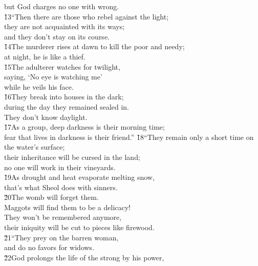 \begin{poetry}
\poemlll       but God charges no one with wrong. \\
\poeml \v{13}``Then there are those who rebel against the light; \\
\poemll    they are not acquainted with its ways; \\
\poemlll       and they don't stay on its course. \\
\poeml \v{14}The murderer rises at dawn to kill the poor and needy; \\
\poemll    at night, he is like a thief. \\
\poeml \v{15}The adulterer watches for twilight, \\
\poemll    saying, `No eye is watching me' \\
\poemlll       while he veils his face. \\
\poeml \v{16}They break into houses in the dark; \\
\poemll    during the day they remained sealed in. \\
\poemlll       They don't know daylight. \\
\poeml \v{17}As a group, deep darkness is their morning time; \\
\poemll    fear that lives in darkness is their friend.''
\poeml \v{18}``They remain only a short time on the water's surface; \\
\poemll    their inheritance will be cursed in the land; \\
\poemlll       no one will work in their vineyards. \\
\poeml \v{19}As drought and heat evaporate melting snow, \\
\poemll    that's what Sheol does with sinners. \\
\poeml \v{20}The womb will forget them. \\
\poemll    Maggots will find them to be a delicacy! \\
\poeml They won't be remembered anymore, \\
\poemll    their iniquity will be cut to pieces like firewood. \\
\poeml \v{21}``They prey on the barren woman, \\
\poemll    and do no favors for widows. \\
\poeml \v{22}God prolongs the life of the strong by his power, \\

\end{poetry}
